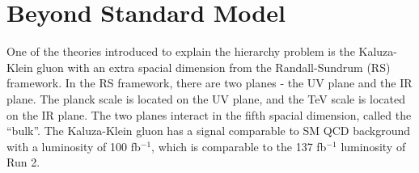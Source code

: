 \section{Beyond Standard Model}

One of the theories introduced to explain the hierarchy problem is the Kaluza-Klein gluon with an extra spacial dimension from the Randall-Sundrum (RS) framework. In the RS framework, there are two planes - the UV plane and the IR plane. The planck scale is located on the UV plane, and the TeV scale is located on the IR plane. The two planes interact in the fifth spacial dimension, called the “bulk”. The Kaluza-Klein gluon has a signal comparable to SM QCD background with a luminosity of 100 fb$^{-1}$, which is comparable to the 137 fb$^{-1}$ luminosity of Run 2.